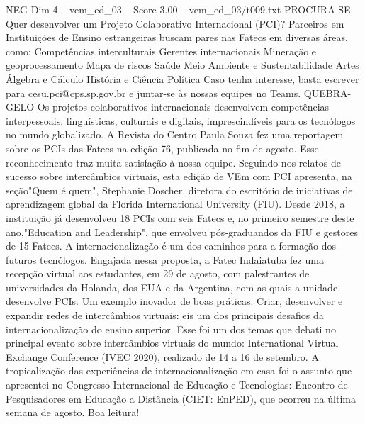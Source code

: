 \begin{textsample}{NEG Dim 4 – vem\_ed\_03 – Score 3.00 – vem\_ed\_03/t009.txt}  \label{ex:f4_neg_113}
PROCURA-SE Quer desenvolver um Projeto Colaborativo Internacional (PCI)?
Parceiros em Instituições de Ensino estrangeiras buscam pares nas Fatecs em diversas áreas, como: Competências interculturais Gerentes internacionais Mineração e geoprocessamento Mapa de riscos Saúde Meio Ambiente e Sustentabilidade Artes Álgebra e Cálculo História e Ciência Política Caso tenha interesse, basta escrever para cesu.pci@cps.sp.gov.br e juntar-se às nossas equipes no Teams.
QUEBRA-GELO Os projetos colaborativos internacionais desenvolvem competências interpessoais, linguísticas, culturais e digitais, imprescindíveis para os tecnólogos no mundo globalizado.
A Revista do Centro Paula Souza fez uma reportagem sobre os PCIs das Fatecs na edição 76, publicada no fim de agosto.
Esse reconhecimento traz muita satisfação à nossa equipe.
Seguindo nos relatos de sucesso sobre intercâmbios virtuais, esta edição de VEm com PCI apresenta, na seção"Quem é quem", Stephanie Doscher, diretora do escritório de iniciativas de aprendizagem global da Florida International University (FIU).
Desde 2018, a instituição já desenvolveu 18 PCIs com seis Fatecs e, no primeiro semestre deste ano,"Education and Leadership", que envolveu pós-graduandos da FIU e gestores de 15 Fatecs.
A internacionalização é um dos caminhos para a formação dos futuros tecnólogos.
Engajada nessa proposta, a Fatec Indaiatuba fez uma recepção virtual aos estudantes, em 29 de agosto, com palestrantes de universidades da Holanda, dos EUA e da Argentina, com as quais a unidade desenvolve PCIs.
Um exemplo inovador de boas práticas.
Criar, desenvolver e expandir redes de intercâmbios virtuais: eis um dos principais desafios da internacionalização do ensino superior.
Esse foi um dos temas que debati no principal evento sobre intercâmbios virtuais do mundo: International Virtual Exchange Conference (IVEC 2020), realizado de 14 a 16 de setembro.
A tropicalização das experiências de internacionalização em casa foi o assunto que apresentei no Congresso Internacional de Educação e Tecnologias: Encontro de Pesquisadores em Educação a Distância (CIET: EnPED), que ocorreu na última semana de agosto.
Boa leitura!

\end{textsample}
